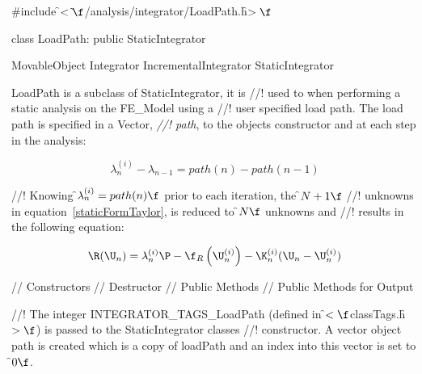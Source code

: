 
\indent \#include \f$<\tilde{ }\f$/analysis/integrator/LoadPath.h\f$>\f$

\indent class LoadPath: public StaticIntegrator

\indent MovableObject
\indent\indent Integrator
\indent\indent\indent IncrementalIntegrator
\indent\indent\indent\indent StaticIntegrator
\indent\indent\indent\indent{}

\indent LoadPath is a subclass of StaticIntegrator, it is
//! used to when performing a static analysis on the FE\_Model using a
//! user specified load path. The load path is specified in a Vector, {\em
//! path}, to the objects constructor and at each step in the analysis:

\[ 
\lambda_n^{(i)} - \lambda_{n-1} = path(n) - path(n-1)
\]

//! Knowing \f$\lambda_n^{(i)} = path(n)\f$ prior to each iteration, the \f$N+1\f$
//! unknowns in equation~\ref{staticFormTaylor}, is reduced to \f$N\f$ unknowns and
//! results in the following equation:

\begin{equation} 
\R(\U_{n}) = \lambda_n^{(i)} \P 
 - \f_{R}\left(\U_{n}^{(i)} \right) - 
\K_n^{(i)} 
(\U_{n} - \U_{n}^{(i)})  
\label{staticFormLoadPath}
\end{equation} 

\indent // Constructors
\indent // Destructor
\indent // Public Methods
\indent // Public Methods for Output

//! The integer INTEGRATOR\_TAGS\_LoadPath (defined in
\f$<\f$classTags.h\f$>\f$) is passed to the StaticIntegrator classes
//! constructor. A vector object \p path is created which is a copy of
\p loadPath and an index into this vector is set to \f$0\f$.

